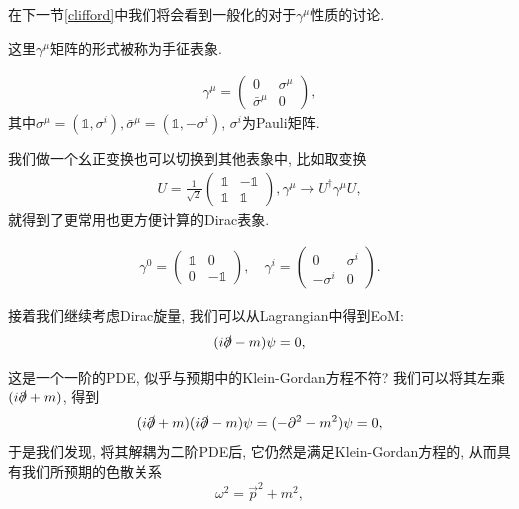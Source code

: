 在下一节\ref{clifford}中我们将会看到一般化的对于$\gamma^\mu$性质的讨论.

这里$\gamma^\mu$矩阵的形式被称为手征表象.
\begin{definition}[手征表象]
    \begin{align}
            \gamma^\mu=\begin{pmatrix}
            0 & \sigma^\mu\\
            \bar\sigma^\mu & 0
        \end{pmatrix},
    \end{align}
    其中$\sigma^\mu=(\mathds{1}, \sigma^i), \bar\sigma^\mu=(\mathds{1}, -\sigma^i)$, $\sigma^i$为Pauli矩阵.
\end{definition}
我们做一个幺正变换也可以切换到其他表象中, 比如取变换
\begin{align}
    U=\frac1{\sqrt2}\begin{pmatrix}
        \mathds1 & -\mathds{1}\\
        \mathds1 & \mathds1
    \end{pmatrix}, \gamma^\mu\to U^\dagger\gamma^\mu U,
\end{align}
就得到了更常用也更方便计算的Dirac表象.
\begin{definition}[Dirac表象]
    \begin{align}
        \gamma^0=\begin{pmatrix}
            \mathds{1} & 0\\
            0 & -\mathds{1}
        \end{pmatrix},\quad
        \gamma^i=\begin{pmatrix}
            0 & \sigma^i\\
            -\sigma^i & 0
        \end{pmatrix}.
    \end{align}
\end{definition}

接着我们继续考虑Dirac旋量, 我们可以从Lagrangian中得到EoM:
\begin{equation}
    (i\slashed\partial-m)\psi=0,
\end{equation}

这是一个一阶的PDE, 似乎与预期中的Klein-Gordan方程不符? 我们可以将其左乘$(i\slashed\partial+m)$, 得到
\begin{equation}
    (i\slashed\partial+m)(i\slashed\partial-m)\psi=(-\partial^2-m^2)\psi=0,
\end{equation}
于是我们发现, 将其解耦为二阶PDE后, 它仍然是满足Klein-Gordan方程的, 从而具有我们所预期的色散关系
\begin{equation}
    \omega^2=\vec p^2+m^2,
\end{equation}

